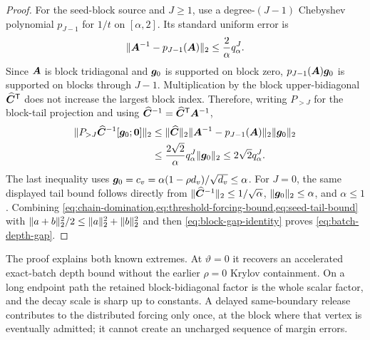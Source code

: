 \begin{proof}
For the seed-block source and $J\geq1$, use a degree-$(J-1)$ Chebyshev
polynomial $p_{J-1}$ for $1/t$ on $[\alpha,2]$.  Its standard uniform error is
\begin{equation}
 \lVert\bm{A}^{-1}-p_{J-1}(\bm{A})\rVert_2
 \leq\frac2\alpha q_\alpha^J.
 \label{eq:inverse-chebyshev}
\end{equation}
Since $\bm{A}$ is block tridiagonal and $\bm{g}_0$ is supported on block zero,
$p_{J-1}(\bm{A})\bm{g}_0$ is supported on blocks through $J-1$.  Multiplication by
the block upper-bidiagonal $\widehat{\bm{C}}^{\mathsf{T}}$ does not increase the
largest block index.  Therefore, writing $P_{>J}$ for the block-tail
projection and using
$\widehat{\bm{C}}^{-1}=\widehat{\bm{C}}^{\mathsf{T}}\bm{A}^{-1}$,
\begin{align}
 \lVert P_{>J}\widehat{\bm{C}}^{-1}[\bm{g}_0;\bm{0}]\rVert_2
 &\leq\lVert\widehat{\bm{C}}\rVert_2
       \lVert\bm{A}^{-1}-p_{J-1}(\bm{A})\rVert_2\lVert\bm{g}_0\rVert_2\notag\\
 &\leq\frac{2\sqrt2}{\alpha}q_\alpha^J\lVert\bm{g}_0\rVert_2
 \leq2\sqrt2q_\alpha^J.
 \label{eq:seed-tail-bound}
\end{align}
The last inequality uses
$\bm{g}_0=c_v=\alpha(1-\rho d_v)/\sqrt{d_v}\leq\alpha$.
For $J=0$, the same displayed tail bound follows directly from
$\lVert\widehat{\bm{C}}^{-1}\rVert_2\leq1/\sqrt\alpha$,
$\lVert\bm{g}_0\rVert_2\leq\alpha$, and $\alpha\leq1$.
Combining \cref{eq:chain-domination,eq:threshold-forcing-bound,eq:seed-tail-bound}
with $\lVert a+b\rVert_2^2/2\leq\lVert a\rVert_2^2+\lVert b\rVert_2^2$ and then
\cref{eq:block-gap-identity} proves \cref{eq:batch-depth-gap}.
\end{proof}

The proof explains both known extremes.  At $\vartheta=0$ it recovers an
accelerated exact-batch depth bound without the earlier $\rho=0$ Krylov
containment.  On a long endpoint path the retained block-bidiagonal factor is
the whole scalar factor, and the decay scale is sharp up to constants.  A
delayed same-boundary release contributes to the distributed forcing only
once, at the block where that vertex is eventually admitted; it cannot create
an uncharged sequence of margin errors.

